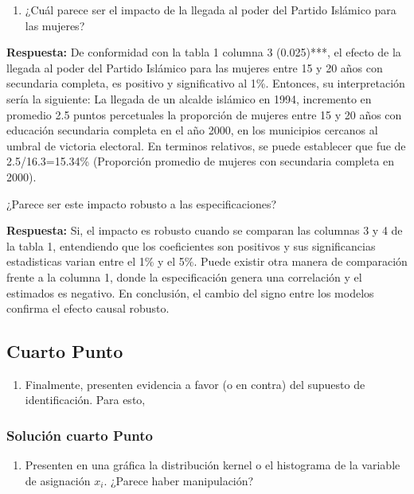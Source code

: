 \documentclass[
]{article}
\providecommand{\tightlist}{%
  \setlength{\itemsep}{0pt}\setlength{\parskip}{0pt}}
\begin{document}
\begin{enumerate}
\def\labelenumi{\alph{enumi})}
\setcounter{enumi}{1}
\tightlist
\item
  ¿Cuál parece ser el impacto de la llegada al poder del Partido
  Islámico para las mujeres?
\end{enumerate}

\textbf{Respuesta:} De conformidad con la tabla 1 columna 3 (0.025)***,
el efecto de la llegada al poder del Partido Islámico para las mujeres
entre 15 y 20 años con secundaria completa, es positivo y significativo
al 1\%. Entonces, su interpretación sería la siguiente: La llegada de un
alcalde islámico en 1994, incremento en promedio 2.5 puntos percetuales
la proporción de mujeres entre 15 y 20 años con educación secundaria
completa en el año 2000, en los municipios cercanos al umbral de
victoria electoral. En terminos relativos, se puede establecer que fue
de 2.5/16.3=15.34\% (Proporción promedio de mujeres con secundaria
completa en 2000).

¿Parece ser este impacto robusto a las especificaciones?

\textbf{Respuesta:} Si, el impacto es robusto cuando se comparan las
columnas 3 y 4 de la tabla 1, entendiendo que los coeficientes son
positivos y sus significancias estadisticas varian entre el 1\% y el
5\%. Puede existir otra manera de comparación frente a la columna 1,
donde la especificación genera una correlación y el estimados es
negativo. En conclusión, el cambio del signo entre los modelos confirma
el efecto causal robusto.

\subsection{Cuarto Punto}\label{cuarto-punto}

\begin{enumerate}
\def\labelenumi{\arabic{enumi}.}
\setcounter{enumi}{3}
\tightlist
\item
  Finalmente, presenten evidencia a favor (o en contra) del supuesto de
  identificación. Para esto,
\end{enumerate}

\subsubsection{Solución cuarto Punto}\label{soluciuxf3n-cuarto-punto}

\begin{enumerate}
\def\labelenumi{\alph{enumi})}
\tightlist
\item
  Presenten en una gráfica la distribución kernel o el histograma de la
  variable de asignación \(x_i\). ¿Parece haber manipulación?
\end{enumerate}
\end{document}
